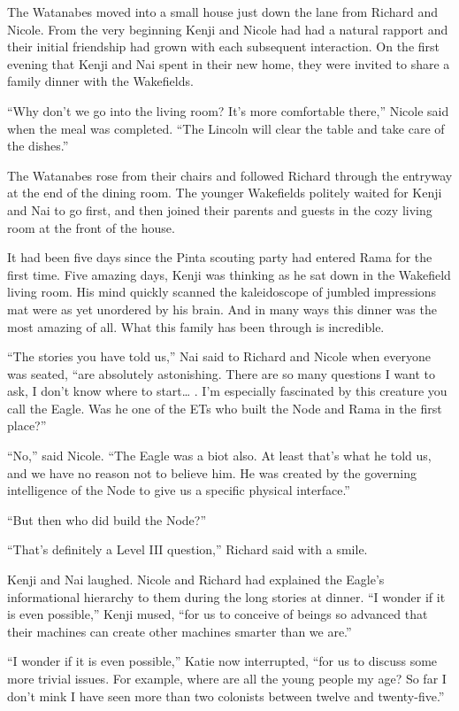 \documentclass[]{article}
\begin{document}
{The Watanabes moved into a small house just down the lane from Richard and Nicole. From the very beginning Kenji and Nicole had had a natural rapport and their initial friendship had grown with each subsequent interaction. On the first evening that Kenji and Nai spent in their new home, they were invited to share a family dinner with the Wakefields.

“Why don’t we go into the living room? It’s more comfortable there,” Nicole said when the meal was completed. “The Lincoln will clear the table and take care of the dishes.”

The Watanabes rose from their chairs and followed Richard through the entryway at the end of the dining room. The younger Wakefields politely waited for Kenji and Nai to go first, and then joined their parents and guests in the cozy living room at the front of the house.

It had been five days since the Pinta scouting party had entered Rama for the first time. Five amazing days, Kenji was thinking as he sat down in the Wakefield living room. His mind quickly scanned the kaleidoscope of jumbled impressions mat were as yet unordered by his brain. And in many ways this dinner was the most amazing of all. What this family has been through is incredible.

“The stories you have told us,” Nai said to Richard and Nicole when everyone was seated, “are absolutely astonishing. There are so many questions I want to ask, I don’t know where to start… . I’m especially fascinated by this creature you call the Eagle. Was he one of the ETs who built the Node and Rama in the first place?”

“No,” said Nicole. “The Eagle was a biot also. At least that’s what he told us, and we have no reason not to believe him. He was created by the governing intelligence of the Node to give us a specific physical interface.”

“But then who did build the Node?”

“That’s definitely a Level III question,” Richard said with a smile.

Kenji and Nai laughed. Nicole and Richard had explained the Eagle’s informational hierarchy to them during the long stories at dinner. “I wonder if it is even possible,” Kenji mused, “for us to conceive of beings so advanced that their machines can create other machines smarter than we are.”

“I wonder if it is even possible,” Katie now interrupted, “for us to discuss some more trivial issues. For example, where are all the young people my age? So far I don’t mink I have seen more than two colonists between twelve and twenty-five.”

}
\end{document}
